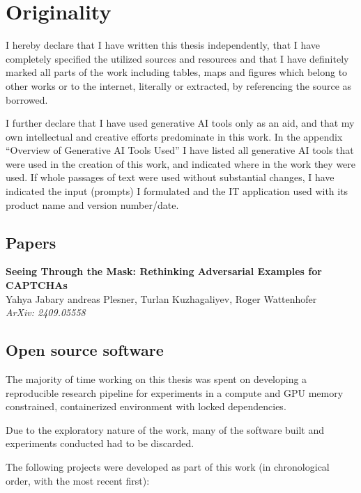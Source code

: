 \documentclass[a4paper, oneside]{discothesis}
\begin{document}
\chapter*{Originality}

I hereby declare that I have written this thesis independently, that I have completely specified the utilized sources and resources and that I have definitely marked all parts of the work \textendash{} including tables, maps and figures \textendash{} which belong to other works or to the internet, literally or extracted, by referencing the source as borrowed.

I further declare that I have used generative AI tools only as an aid, and that my own intellectual and creative efforts predominate in this work. In the appendix ``Overview of Generative AI Tools Used'' I have listed all generative AI tools that were used in the creation of this work, and indicated where in the work they were used. If whole passages of text were used without substantial changes, I have indicated the input (prompts) I formulated and the IT application used with its product name and version number/date.

\section*{Papers}

\begin{spacing}{1}
	\textbf{Seeing Through the Mask: Rethinking Adversarial Examples for CAPTCHAs} \\
	Yahya Jabary andreas Plesner, Turlan Kuzhagaliyev, Roger Wattenhofer \\
	\textit{ArXiv: 2409.05558}
\end{spacing}

\section*{Open source software}

The majority of time working on this thesis was spent on developing a reproducible research pipeline for experiments in a compute and GPU memory constrained, containerized environment with locked dependencies.

Due to the exploratory nature of the work, many of the software built and experiments conducted had to be discarded.

The following projects were developed as part of this work (in chronological order, with the most recent first):
\end{document}
